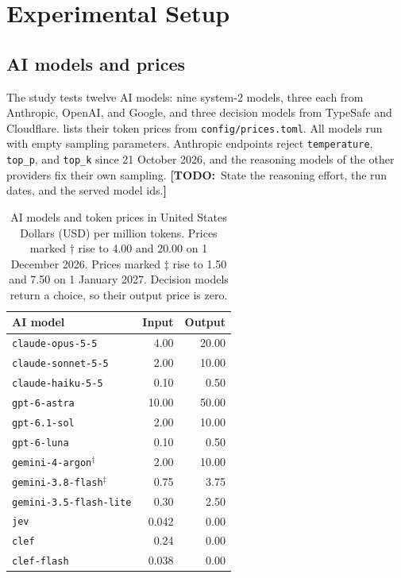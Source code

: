 \documentclass[10pt,twocolumn,letterpaper]{article}
\newcommand{\todo}[1]{{\color{red!70!black}\textbf{[TODO:}~#1\textbf{]}}}
\newcommand{\code}[1]{\texttt{#1}}
\begin{document}
\section{Experimental Setup}\label{sec:setup}
\subsection{AI models and prices}\label{sec:models}
The study tests twelve AI models: nine system-2 models, three each from Anthropic, OpenAI, and Google, and three decision models from TypeSafe and Cloudflare.  lists their token prices from \code{config/prices.toml}. All models run with empty sampling parameters. Anthropic endpoints reject \code{temperature}, \code{top\_p}, and \code{top\_k} since 21 October 2026, and the reasoning models of the other providers fix their own sampling. \todo{State the reasoning effort, the run dates, and the served model ids.}

\begin{table}[t]
\caption{AI models and token prices in United States Dollars (USD) per million tokens. Prices marked $\dagger$ rise to 4.00 and 20.00 on 1 December 2026. Prices marked $\ddagger$ rise to 1.50 and 7.50 on 1 January 2027. Decision models return a choice, so their output price is zero.}
\label{tab:models}
\small
\begin{tabularx}{\linewidth}{@{}Xrr@{}}
\toprule
AI model & Input & Output \\
\midrule
\code{claude-opus-5-5}       & 4.00  & 20.00 \\
\code{claude-sonnet-5-5}     & 2.00  & 10.00 \\
\code{claude-haiku-5-5}      & 0.10  & 0.50  \\
\code{gpt-6-astra}           & 10.00 & 50.00 \\
\code{gpt-6.1-sol}           & 2.00  & 10.00 \\
\code{gpt-6-luna}            & 0.10  & 0.50  \\
\code{gemini-4-argon}$^{\dagger}$   & 2.00  & 10.00 \\
\code{gemini-3.8-flash}$^{\ddagger}$ & 0.75  & 3.75  \\
\code{gemini-3.5-flash-lite} & 0.30  & 2.50  \\
\code{jev}                  & 0.042 & 0.00  \\
\code{clef}                 & 0.24  & 0.00  \\
\code{clef-flash}           & 0.038 & 0.00  \\
\bottomrule
\end{tabularx}
\end{table}
\end{document}
